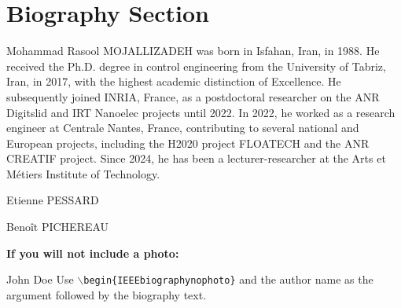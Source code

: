 \documentclass[lettersize,journal]{IEEEtran}
\begin{document}
\newpage

\section{Biography Section}
 

\begin{IEEEbiography}{Mohammad Rasool MOJALLIZADEH} was born in Isfahan, Iran, in 1988. He
received the Ph.D. degree in control engineering from the University of Tabriz, Iran, in 2017, with the highest academic distinction of Excellence. He subsequently joined INRIA, France, as a postdoctoral researcher on the ANR Digitslid and IRT Nanoelec projects until 2022. In 2022, he worked as a research engineer at Centrale Nantes, France, contributing to several national and European projects, including the H2020 project FLOATECH and the ANR CREATIF project. Since 2024, he has been a lecturer-researcher at the Arts et Métiers Institute of Technology.
\end{IEEEbiography}

\vspace{11pt}

\begin{IEEEbiography}{Etienne PESSARD}
\end{IEEEbiography}

\vspace{11pt}

\begin{IEEEbiography}{Benoît PICHEREAU}

\end{IEEEbiography}

\vspace{11pt}

\bf{If you will not include a photo:}\vspace{-33pt}
\begin{IEEEbiographynophoto}{John Doe}
Use $\backslash${\tt{begin\{IEEEbiographynophoto\}}} and the author name as the argument followed by the biography text.
\end{IEEEbiographynophoto}




\vfill
\end{document}

